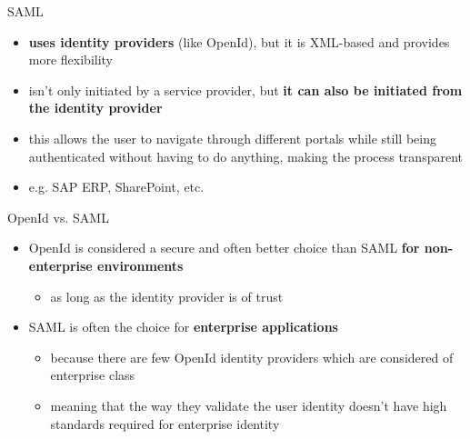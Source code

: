 \documentclass[pdf]{beamer}
\begin{document}
\begin{frame}{SAML}
\begin{itemize}
\item
\textbf{uses identity providers} (like OpenId), but it is XML-based and provides more flexibility

\item
isn't only initiated by a service provider, but \textbf{it can also be initiated from the identity provider}

\item
this allows the user to navigate through different portals while still being authenticated without having to do anything, making the process transparent

\item
e.g. SAP ERP, SharePoint, etc.
\end{itemize}
\end{frame}



\begin{frame}{OpenId vs. SAML}
\begin{itemize}
\item
OpenId is considered a secure and often better choice than SAML \textbf{for non-enterprise environments}

\begin{itemize}
\item
as long as the identity provider is of trust
\newline
\end{itemize}

\item
SAML is often the choice for \textbf{enterprise applications}

\begin{itemize}
\item
because there are few OpenId identity providers which are considered of enterprise class

\item
meaning that the way they validate the user identity doesn't have high standards required for enterprise identity
\end{itemize}

\end{itemize}
\end{frame}
\end{document}
